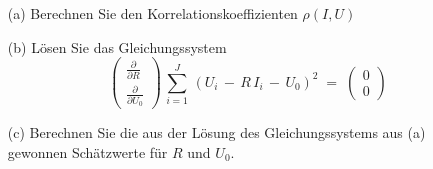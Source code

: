 \begin{itemize}
\item[(a)] Berechnen Sie den Korrelationskoeffizienten $\rho(I, U)$
\item[(b)] Lösen Sie das Gleichungssystem
\begin{equation}
\left(\begin{array}{c}
\frac{\partial}{\partial R}\\
\frac{\partial}{\partial U_0}
\end{array}\right)
\, \sum_{i = 1}^J \, \left(U_i \, - \, R \, I_i  \, - \,  U_0\right)^2 \; = \;
\left(\begin{array}{c}
0\\
0
\end{array}\right)
\label{regrGerGS}
\end{equation}
\item[(c)] Berechnen Sie die aus der Lösung des Gleichungssystems aus (a) gewonnen Schätzwerte
für $R$ und $U_0$.
\end{itemize}




